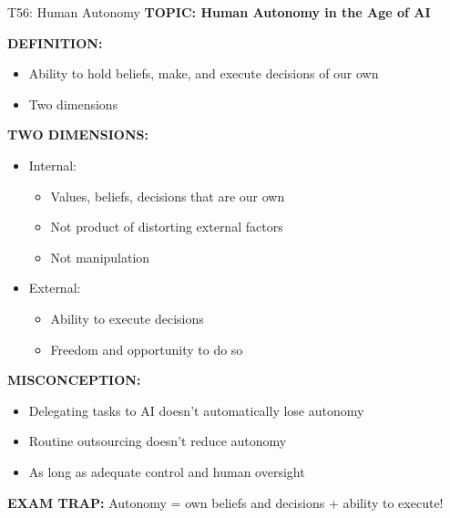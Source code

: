 \documentclass[8pt]{beamer}
\begin{document}
	\begin{frame}{T56: Human Autonomy}
		\fontsize{6.5}{7.5}\selectfont
		\textbf{TOPIC: Human Autonomy in the Age of AI}
		
		\vspace{0.1cm}
		\textbf{DEFINITION:}
		\begin{itemize}
			\item Ability to hold beliefs, make, and execute decisions of our own
			\item Two dimensions
		\end{itemize}
		
		\vspace{0.1cm}
		\textbf{TWO DIMENSIONS:}
		\begin{itemize}
			\item \textcolor{myblue}{Internal:}
			\begin{itemize}
				\item Values, beliefs, decisions that are our own
				\item Not product of distorting external factors
				\item Not manipulation
			\end{itemize}
			\item \textcolor{myblue}{External:}
			\begin{itemize}
				\item Ability to execute decisions
				\item Freedom and opportunity to do so
			\end{itemize}
		\end{itemize}
		
		\vspace{0.1cm}
		\textbf{MISCONCEPTION:}
		\begin{itemize}
			\item Delegating tasks to AI doesn't automatically lose autonomy
			\item Routine outsourcing doesn't reduce autonomy
			\item As long as adequate control and human oversight
		\end{itemize}
		
		\textcolor{myred}{\textbf{EXAM TRAP:}} Autonomy = \textcolor{myblue}{own beliefs and decisions + ability to execute}!
	\end{frame}
	
\end{document}

